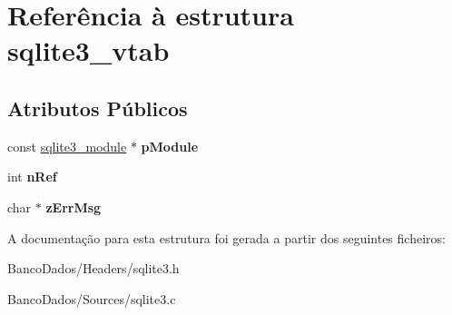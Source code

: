 \hypertarget{structsqlite3__vtab}{\section{Referência à estrutura sqlite3\-\_\-vtab}
\label{structsqlite3__vtab}
}
\subsection*{Atributos Públicos}
\begin{DoxyCompactItemize}
\item 
\hypertarget{structsqlite3__vtab_acf0d906e36b113669eaa883c5f8b5ba0}{const \hyperlink{structsqlite3__module}{sqlite3\-\_\-module} $\ast$ {\bfseries p\-Module}}\label{structsqlite3__vtab_acf0d906e36b113669eaa883c5f8b5ba0}

\item 
\hypertarget{structsqlite3__vtab_ab3c80d385849bdd82363a0df7d6fcba8}{int {\bfseries n\-Ref}}\label{structsqlite3__vtab_ab3c80d385849bdd82363a0df7d6fcba8}

\item 
\hypertarget{structsqlite3__vtab_a47331586775d674ae951b07ebb902fca}{char $\ast$ {\bfseries z\-Err\-Msg}}\label{structsqlite3__vtab_a47331586775d674ae951b07ebb902fca}

\end{DoxyCompactItemize}


A documentação para esta estrutura foi gerada a partir dos seguintes ficheiros\-:\begin{DoxyCompactItemize}
\item 
Banco\-Dados/\-Headers/sqlite3.\-h\item 
Banco\-Dados/\-Sources/sqlite3.\-c\end{DoxyCompactItemize}
